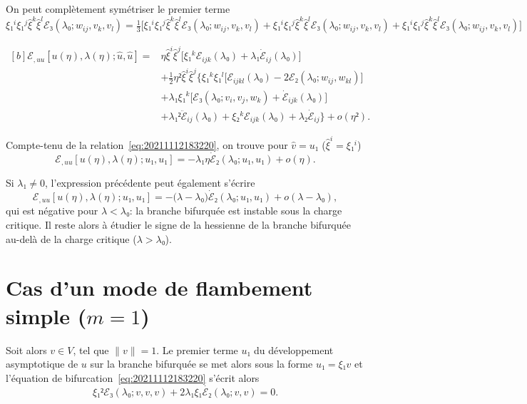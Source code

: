 \documentclass[12pt, final]{amsart}
\begin{document}
On peut complètement symétriser le premier terme
\begin{equation}
  ξ₁^iξ₁^j\hat{ξ}^k\hat{ξ}^lℰ₃(λ₀; w_{ij}, v_k, v_l)
  =\tfrac13\bigl[ξ₁^iξ₁^j\hat{ξ}^k\hat{ξ}^lℰ₃(λ₀; w_{ij}, v_k, v_l)
  +ξ₁^iξ₁^j\hat{ξ}^k\hat{ξ}^lℰ₃(λ₀; w_{ij}, v_k, v_l)
  +ξ₁^iξ₁^j\hat{ξ}^k\hat{ξ}^lℰ₃(λ₀; w_{ij}, v_k, v_l)\bigr]
\end{equation}

\begin{equation}
  \label{eq:20220203144500}
  \begin{aligned}[b]
    ℰ_{,uu}[u(η), λ(η); \hat{u}, \hat{u}]
    ={}&η\hat{ξ}^i\hat{ξ}^j\bigl[ξ₁^kℰ_{ijk}(λ₀)+λ₁\dot{ℰ}_{ij}(λ₀)\bigr]\\
    &+\tfrac12η²\hat{ξ}^i\hat{ξ}^j\bigl\{ξ₁^kξ₁^l\bigl[ℰ_{ijkl}(λ₀)
    -2ℰ₂(λ₀; w_{ij}, w_{kl})\bigr]\\
    &+λ₁ξ₁^k\bigl[ℰ₃(λ₀; v_i, v_j, w_k)+\dot{ℰ}_{ijk}(λ₀)\bigr]\\
    &+λ₁²\ddot{ℰ}_{ij}(λ₀)+ξ₂^kℰ_{ijk}(λ₀)+λ₂\dot{ℰ}_{ij}\bigr\}+o(η²).
  \end{aligned}
\end{equation}

Compte-tenu de la relation~\eqref{eq:20211112183220}, on trouve pour
\(\hat{v}=u₁\) (\(\hat{ξ}^i=ξ₁^i\))
\begin{equation}
  ℰ_{,uu}[u(η), λ(η); u₁, u₁]=-λ₁η\dot{ℰ}₂(λ₀; u₁, u₁)+o(η).
\end{equation}

Si \(λ₁≠0\), l'expression précédente peut également s'écrire
\begin{equation}
  ℰ_{,uu}[u(η), λ(η); u₁, u₁]=-\bigl(λ-λ₀\bigr)\dot{ℰ}₂(λ₀; u₁, u₁)+o(λ-λ₀),
\end{equation}
qui est négative pour \(λ<λ₀\): la branche bifurquée est instable sous la
charge critique. Il reste alors à étudier le signe de la hessienne de la
branche bifurquée au-delà de la charge critique (\(λ>λ₀\)).

\section{Cas d'un mode de flambement simple (\(m=1\))}

Soit alors \(v∈V\), tel que \(\lVert v\rVert=1\). Le premier terme \(u₁\) du
développement asymptotique de \(u\) sur la branche bifurquée se met alors sous
la forme \(u₁=ξ₁v\) et l'équation de bifurcation~\eqref{eq:20211112183220}
s'écrit alors
\begin{equation}
  \label{eq:20220203144712}
  ξ₁² ℰ₃(λ₀;v, v, v)+2λ₁ξ₁\dot{ℰ₂}(λ₀;v, v)=0.
\end{equation}
\end{document}

